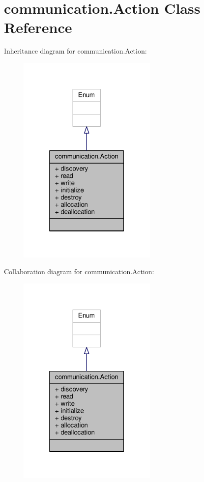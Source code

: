 \hypertarget{classcommunication_1_1Action}{}\section{communication.\+Action Class Reference}
\label{classcommunication_1_1Action}


Inheritance diagram for communication.\+Action\+:\nopagebreak
\begin{figure}[H]
\begin{center}
\leavevmode
\includegraphics[width=193pt]{classcommunication_1_1Action__inherit__graph}
\end{center}
\end{figure}


Collaboration diagram for communication.\+Action\+:\nopagebreak
\begin{figure}[H]
\begin{center}
\leavevmode
\includegraphics[width=193pt]{classcommunication_1_1Action__coll__graph}
\end{center}
\end{figure}
